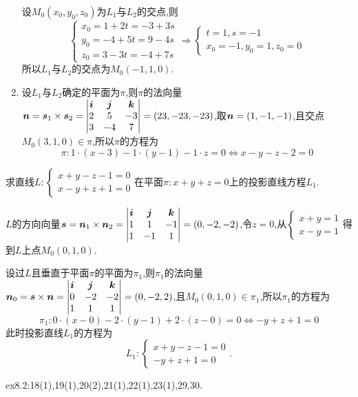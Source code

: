 \begin{solution}
\begin{enumerate}
        设$M_0(x_0,y_0,z_0)$为$L_1$与$L_2$的交点,则
        $$
        \begin{cases}
           x_0 = 1+2t = -3+3s \\
        y_0 = -4+5t = 9-4s \\
            z_0 = 3-3t = -4+7s
        \end{cases} \Rightarrow
        \begin{cases}
            t = 1,s = -1 \\
            x_0 = -1,y_0 = 1,z_0 = 0
        \end{cases}
        $$
        所以$L_1$与$L_2$的交点为$M_0(-1,1,0)$.

        \item 设$L_1$与$L_2$确定的平面为$\pi$,则$\pi$的法向量$\bm{n} = \bm{s}_1 \times \bm{s}_2 = \begin{vmatrix}
            \bm{i} & \bm{j} & \bm{k} \\
            2 & 5 & -3 \\
            3 & -4 & 7
        \end{vmatrix} = (23,-23,-23)$,取$\bm{n} = (1,-1,-1)$,且交点$M_0(3,1,0) \in \pi$,所以$\pi$的方程为
        $$
        \pi: 1 \cdot (x-3) - 1 \cdot (y-1) - 1 \cdot z = 0 \Leftrightarrow x-y-z-2 = 0
        $$  
    \end{enumerate}
\end{solution}

\begin{example}
    求直线$L:\begin{cases}
    x+y-z-1 = 0\\
    x-y+z+1 = 0
    \end{cases}$在平面$\pi:x+y+z=0$上的投影直线方程$L_1$.
\end{example}

\begin{solution}
    $L$的方向向量$\bm{s} = \bm{n}_1 \times \bm{n}_2 = \begin{vmatrix}
        \bm{i} & \bm{j} & \bm{k} \\
        1 & 1 & -1 \\
        1 & -1 & 1
    \end{vmatrix} = (0,-2,-2)$,令$z=0$,从$\begin{cases}
        x+y=1\\
        x-y=1
    \end{cases} $得到$L$上点$M_0(0,1,0)$.

    设过$L$且垂直于平面$\pi$的平面为$\pi_1$,则$\pi_1$的法向量$\bm{n}_0 = \bm{s} \times \bm{n} = \begin{vmatrix}
        \bm{i} & \bm{j} & \bm{k} \\
        0 & -2 & -2 \\
        1 & 1 & 1
    \end{vmatrix} = (0,-2,2)$,且$M_0(0,1,0) \in \pi_1$,所以$\pi_1$的方程为
    $$
    \pi_1: 0 \cdot (x-0) - 2 \cdot (y-1) + 2 \cdot (z-0) = 0 \Leftrightarrow -y+z+1=0
    $$
    此时投影直线$L_1$的方程为
    $$
    L_1: \begin{cases}
        x+y-z-1 = 0 \\
        -y+z+1 = 0
    \end{cases}.
    $$
\end{solution}


\begin{homework}
    ex8.2:18(1),19(1),20(2),21(1),22(1),23(1),29,30.
\end{homework}


